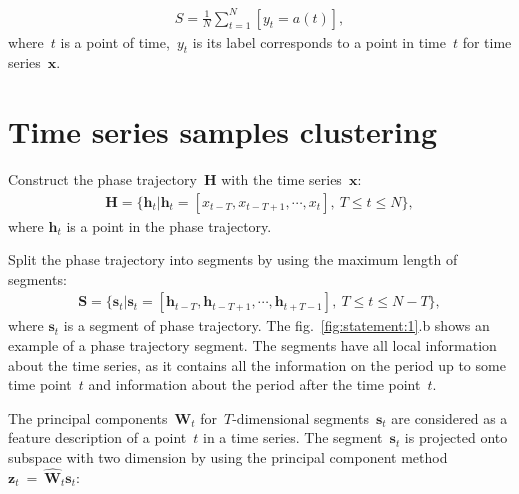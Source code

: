 \documentclass[12pt, twoside]{article}
\numberwithin{equation}{section}
\begin{document}
\begin{equation}
\label{eq:st:7}
\begin{aligned}
S = \frac{1}{N}\sum_{t=1}^{N}[y_t = a\left(t\right)],
\end{aligned}
\end{equation}
where~$t$ is a point of time,~$y_t$ is its label corresponds to a point in time~$t$ for time series~$\textbf{x}$.


\section{Time series samples clustering}
Construct the phase trajectory~$\mathbf{H}$ with the time series~$\textbf{x}$:
\begin{equation}
\label{eq:cl:1}
\begin{aligned}
\mathbf{H} = \{\textbf{h}_t| \textbf{h}_t = [x_{t-T}, x_{t-T+1}, \cdots, x_{t}],~T\leq t\leq N\},
\end{aligned}
\end{equation}
where $\textbf{h}_t$ is a point in the phase trajectory.

Split the phase trajectory into segments by using the maximum length of segments:
\begin{equation}
\label{eq:cl:2}
\begin{aligned}
\mathbf{S} = \{\textbf{s}_t| \textbf{s}_t = [\textbf{h}_{t-T}, \textbf{h}_{t-T+1}, \cdots, \textbf{h}_{t+T-1}],~T\leq t\leq N-T\},
\end{aligned}
\end{equation}
where $\textbf{s}_t$ is a segment of phase trajectory. The fig.~\ref{fig:statement:1}.b shows an example of a phase trajectory segment. The segments have all local information about the time series, as it contains all the information on the period up to some time point~$t$ and information about the period after the time point~$t$.




The principal components~$\textbf{W}_t$ for~$T\text{-dimensional}$ segments~$\textbf{s}_t$ are considered as a feature description of a point~$t$ in a time series. The segment~$\textbf{s}_t $ is projected onto subspace with two dimension by using the principal component method~$\textbf{z}_t~=~\hat{\textbf{W}}_t\textbf{s}_t$:
\end{document}
